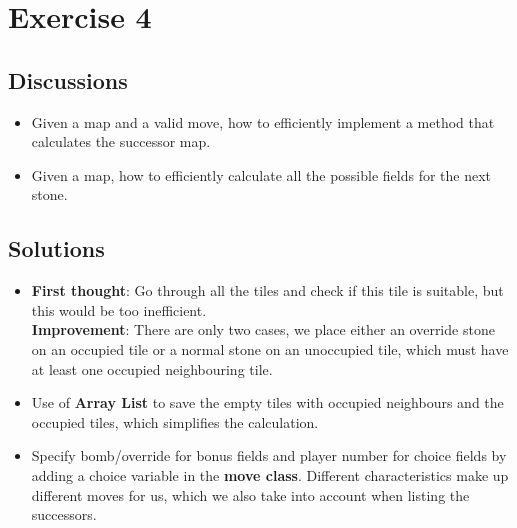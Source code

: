 \section{Exercise 4}
\subsection{Discussions}
\begin{itemize}
    \item Given a map and a valid move, how to efficiently implement a method that calculates the successor map.
    \item Given a map, how to efficiently calculate all the possible fields for the next stone.
    
\end{itemize}

\subsection{Solutions}
\begin{itemize}
    \item \textbf{First thought}: Go through all the tiles and check if this tile is suitable, but this would be too inefficient.\\ \textbf{Improvement}: There are only two cases, we place either an override stone on an occupied tile or a normal stone on an unoccupied tile, which must have at least one occupied neighbouring tile. 
    \item Use of \textbf{Array List} to save the empty tiles with occupied neighbours and the occupied tiles, which simplifies the calculation.
    \item Specify bomb/override for bonus fields and player number for choice fields by adding a choice variable in the \textbf{move class}. Different characteristics make up different moves for us, which we also take into account when listing the successors.
\end{itemize}